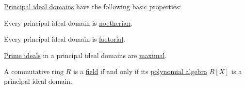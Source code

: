\begin{proposition}\label{thm:def:principal_ideal_domain}
  \hyperref[def:principal_ideal_domain]{Principal ideal domains} have the following basic properties:
  \begin{thmenum}
     Every principal ideal domain is \hyperref[def:noetherian_semiring]{noetherian}.

     Every principal ideal domain is \hyperref[def:factorial_domain]{factorial}.

     \hyperref[def:semiring_ideal/prime]{Prime ideals} in a principal ideal domains are \hyperref[def:semiring_ideal/maximal]{maximal}.

     A commutative ring \( R \) is a \hyperref[def:field]{field} if and only if its \hyperref[def:polynomial_algebra]{polynomial algebra} \( R[X] \) is a principal ideal domain.
  \end{thmenum}
\end{proposition}
